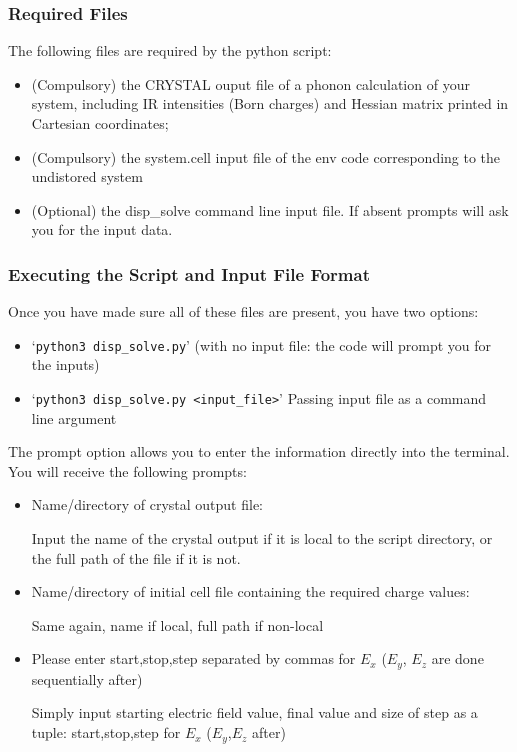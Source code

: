 \subsubsection{Required Files}
The following files are required by the python script:
\begin{itemize}  
  \item (Compulsory) the CRYSTAL ouput file of a phonon calculation of your system, including IR
    intensities (Born charges) and Hessian matrix printed in Cartesian coordinates;
  \item (Compulsory) the system.cell input file of the env code corresponding
    to the undistored system
  \item (Optional) the disp\_solve command line input file. If absent prompts will ask you for the input data.  
\end{itemize}

\subsubsection{Executing the Script and Input File Format}
Once you have made sure all of these files are present, you have two options: 
\begin{itemize}
	\item `\texttt{python3 disp\_solve.py}' (with no input file: the code will prompt you for the inputs)
	\item `\texttt{python3 disp\_solve.py <input\_file>}' Passing input file as a command line argument
\end{itemize}

The prompt option allows you to enter the information directly into the terminal. You will receive the following prompts:

\begin{itemize}
	\item Name/directory of crystal output file:
	
	Input the name of the crystal output if it is local to the script directory, or the full path of the file if it is not.
	
	\item Name/directory of initial cell file containing the required charge values:
	
	Same again, name if local, full path if non-local
	
	\item Please enter start,stop,step separated by commas for $E_x$ ($E_y$, $E_z$ are done sequentially after)
	
	Simply input starting electric field value, final value and size of step as a tuple: start,stop,step for $E_x$ ($E_y$,$E_z$ after)
\end{itemize}

